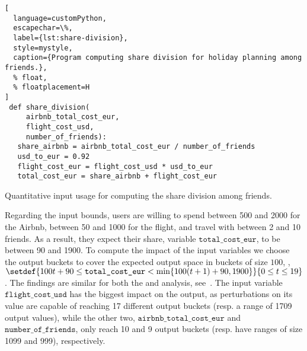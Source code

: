 \begin{lstlisting}[
  language=customPython,
  escapechar=\%,
  label={lst:share-division},
  style=mystyle,
  caption={Program computing share division for holiday planning among friends.},
  % float,
  % floatplacement=H
]
 def share_division(
     airbnb_total_cost_eur,
     flight_cost_usd,
     number_of_friends):
   share_airbnb = airbnb_total_cost_eur / number_of_friends
   usd_to_eur = 0.92
   flight_cost_eur = flight_cost_usd * usd_to_eur
   total_cost_eur = share_airbnb + flight_cost_eur
\end{lstlisting}
%
\begin{margintable}
  \caption{Quantitative input usage for  computing the share division among friends.}
  \centering
\end{margintable}
Regarding the input bounds, users are willing to spend between 500 and 2000 for the Airbnb, between 50 and 1000 for the flight, and travel with between 2 and 10 friends. As a result, they expect their share, variable $\texttt{total\_cost\_eur}$, to be between 90 and 1900.
To compute the impact of the input variables we choose the output buckets to cover the expected output space in buckets of size $100$, \ie, $\setdef{100t + 90 \le \texttt{total\_cost\_eur} < \min \{100(t + 1) + 90, 1900\}}{0 \le t \le 19}$.
The %
findings are similar for both the \outcomesname{} and \rangename{} analysis, see~.
The input variable $\texttt{flight\_cost\_usd}$ has the biggest impact on the output, as perturbations on its value are capable of reaching 17 different output buckets (resp. a range of 1709 output values), while the other two, $\texttt{airbnb\_total\_cost\_eur}$ and $\texttt{number\_of\_friends}$, only reach 10 and 9 output buckets (resp. have ranges of size 1099 and 999), respectively.

